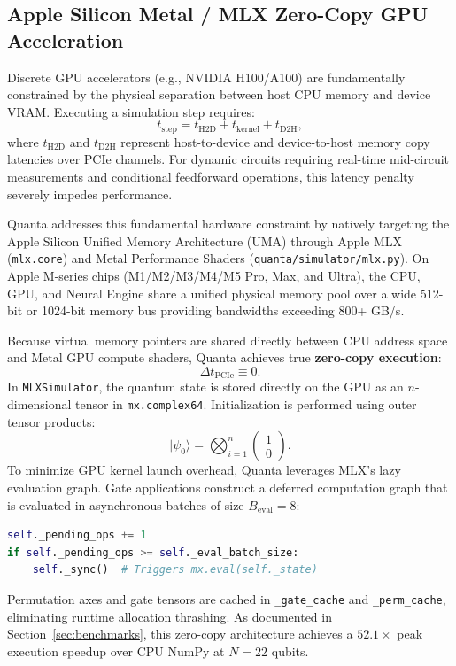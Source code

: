 \documentclass[aps,prx,twocolumn,superscriptaddress,nofootinbib]{revtex4-2}
\newcommand{\ket}[1]{|#1\rangle}
\begin{document}
\subsection{Apple Silicon Metal / MLX Zero-Copy GPU Acceleration}
\label{subsec:mlx_engine}

Discrete GPU accelerators (e.g., NVIDIA H100/A100) are fundamentally constrained by the physical separation between host CPU memory and device VRAM. Executing a simulation step requires:
\begin{equation}
    t_{\text{step}} = t_{\text{H2D}} + t_{\text{kernel}} + t_{\text{D2H}},
\end{equation}
where $t_{\text{H2D}}$ and $t_{\text{D2H}}$ represent host-to-device and device-to-host memory copy latencies over PCIe channels. For dynamic circuits requiring real-time mid-circuit measurements and conditional feedforward operations, this latency penalty severely impedes performance.

Quanta addresses this fundamental hardware constraint by natively targeting the Apple Silicon Unified Memory Architecture (UMA) through Apple MLX (\texttt{mlx.core}) and Metal Performance Shaders (\texttt{quanta/simulator/mlx.py}). On Apple M-series chips (M1/M2/M3/M4/M5 Pro, Max, and Ultra), the CPU, GPU, and Neural Engine share a unified physical memory pool over a wide 512-bit or 1024-bit memory bus providing bandwidths exceeding 800+ GB/s.

Because virtual memory pointers are shared directly between CPU address space and Metal GPU compute shaders, Quanta achieves true \textbf{zero-copy execution}:
\begin{equation}
    \Delta t_{\text{PCIe}} \equiv 0.
\end{equation}
In \texttt{MLXSimulator}, the quantum state is stored directly on the GPU as an $n$-dimensional tensor in \texttt{mx.complex64}. Initialization is performed using outer tensor products:
\begin{equation}
    \ket{\psi_0} = \bigotimes_{i=1}^n \begin{pmatrix} 1 \\ 0 \end{pmatrix}.
\end{equation}
To minimize GPU kernel launch overhead, Quanta leverages MLX's lazy evaluation graph. Gate applications construct a deferred computation graph that is evaluated in asynchronous batches of size $B_{\text{eval}} = 8$:
\begin{lstlisting}[language=Python]
self._pending_ops += 1
if self._pending_ops >= self._eval_batch_size:
    self._sync()  # Triggers mx.eval(self._state)
\end{lstlisting}
Permutation axes and gate tensors are cached in \texttt{\_gate\_cache} and \texttt{\_perm\_cache}, eliminating runtime allocation thrashing. As documented in Section~\ref{sec:benchmarks}, this zero-copy architecture achieves a $52.1\times$ peak execution speedup over CPU NumPy at $N=22$ qubits.
\end{document}
